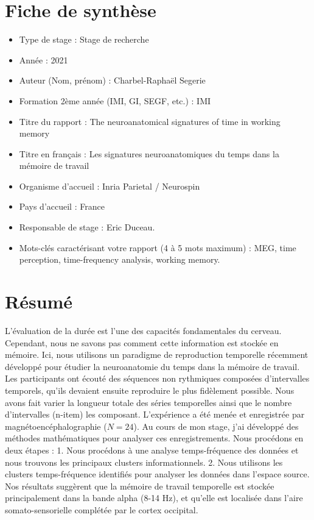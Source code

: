\chapter*{\centering Fiche de synthèse}
\begin{itemize}
    \item Type de stage : Stage de recherche
    \item Année : 2021
    \item Auteur (Nom, prénom) : Charbel-Raphaël Segerie
    \item Formation 2ème année (IMI, GI, SEGF, etc.) : IMI
    \item Titre du rapport : The neuroanatomical signatures of time in working memory
    \item Titre en français : Les signatures neuroanatomiques du temps dans la mémoire de travail
    \item Organisme d’accueil : Inria Parietal / Neurospin
    \item Pays d’accueil : France
    \item Responsable de stage : Eric Duceau.
    \item Mots-clés caractérisant votre rapport (4 à 5 mots maximum) : MEG, time perception, time-frequency analysis, working memory.
\end{itemize}




\chapter*{\centering Résumé}

L'évaluation de la durée est l'une des capacités fondamentales du cerveau. Cependant, nous ne savons pas comment cette information est stockée en mémoire. Ici, nous utilisons un paradigme de reproduction temporelle récemment développé pour étudier la neuroanatomie du temps dans la mémoire de travail. Les participants ont écouté des séquences non rythmiques composées d'intervalles temporels, qu'ils devaient ensuite reproduire le plus fidèlement possible. Nous avons fait varier la longueur totale des séries temporelles ainsi que le nombre d'intervalles (n-item) les composant. L'expérience a été menée et enregistrée par magnétoencéphalographie ($N=24$). Au cours de mon stage, j'ai développé des méthodes mathématiques pour analyser ces enregistrements. Nous procédons en deux étapes : 1. Nous procédons à une analyse temps-fréquence des données et nous trouvons les principaux clusters informationnels. 2. Nous utilisons les clusters temps-fréquence identifiés pour analyser les données dans l'espace source. Nos résultats suggèrent que la mémoire de travail temporelle est stockée principalement dans la bande alpha (8-14 Hz), et qu'elle est localisée dans l'aire somato-sensorielle complétée par le cortex occipital.

